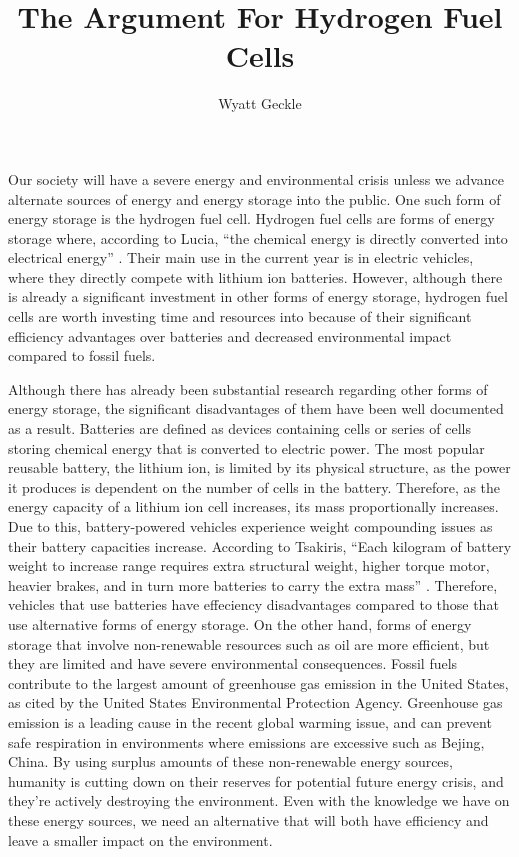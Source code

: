 \documentclass[stu]{apa7}
\title{\textbf{The Argument For Hydrogen Fuel Cells}}
\author{Wyatt Geckle}
\affiliation{Project Lead the Way Engineering}
\begin{document}
    \maketitle
    
    Our society will have a severe energy and environmental crisis unless we advance alternate
    sources of energy and energy storage into the public.  One such form of energy storage is
    the hydrogen fuel cell.  Hydrogen fuel cells are forms of energy storage where, according
    to Lucia, ``the chemical energy is directly converted into electrical energy''
    \parencite{lucia2014overview}.  Their main use in the current year is in electric vehicles,
    where they directly compete with lithium ion batteries.  However, although there is already
    a significant investment in other forms of energy storage, hydrogen fuel cells are worth
    investing time and resources into because of their significant efficiency advantages over
    batteries and decreased environmental impact compared to fossil fuels.
    
    
    Although there has already been substantial research regarding other forms of energy storage,
    the significant disadvantages of them have been well documented as a result.  Batteries are
    defined as devices containing cells or series of cells storing chemical energy that is
    converted to electric power.  The most popular reusable battery, the lithium ion, is limited
    by its physical structure, as the power it produces is dependent on the number of cells in the
    battery.  Therefore, as the energy capacity of a lithium ion cell increases, its mass
    proportionally increases.  Due to this, battery-powered vehicles experience weight compounding
    issues as their battery capacities increase.  According to Tsakiris, ``Each kilogram of battery
    weight to increase range requires extra structural weight, higher torque motor, heavier brakes,
    and in turn more batteries to carry the extra mass'' \parencite{tsakirisanalysis}.  Therefore,
    vehicles that use batteries have effeciency disadvantages compared to those that use
    alternative forms of energy storage.  On the other hand, forms of energy storage that involve
    non-renewable resources such as oil are more efficient, but they are limited and have
    severe environmental consequences.  Fossil fuels contribute to the largest amount of greenhouse
    gas emission in the United States, as cited by the United States Environmental Protection
    Agency.  Greenhouse gas emission is a leading cause in the recent global warming issue, and
    can prevent safe respiration in environments where emissions are excessive such as Bejing,
    China.  By using surplus amounts of these non-renewable energy sources, humanity is cutting
    down on their reserves for potential future energy crisis, and they're actively destroying
    the environment.  Even with the knowledge we have on these energy sources, we need an
    alternative that will both have efficiency and leave a smaller impact on the environment.
    
\end{document}
